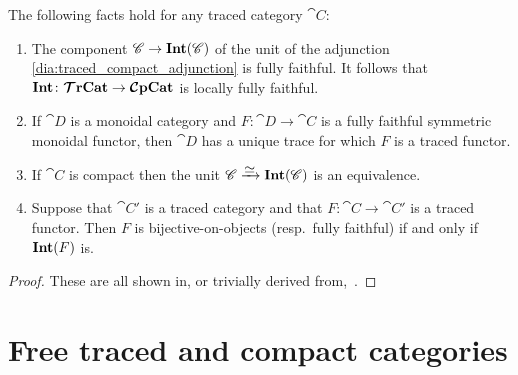 \documentclass[11pt,oneside,article]{memoir}
\begin{document}
\begin{lemma}
      \label{lemma:fully_faithful_and_trace}
   The following facts hold for any traced category $\cat{C}$:
   \begin{enumerate}[label={\upshape\roman*}.]
      \item The component $\mathscr{C}\to\mathbf{Int}(\mathscr{C})$ of the unit of the adjunction
         \eqref{dia:traced_compact_adjunction} is fully faithful. It follows that
         $\mathbf{Int}\colon\bm{\mathcal{T}}\mathbf{rCat}\to\bm{\mathcal{C}}\mathbf{pCat}$ is locally fully faithful.
      \item If $\cat{D}$ is a monoidal category and $F\colon\cat{D}\to\cat{C}$ is a fully faithful
         symmetric monoidal functor, then $\cat{D}$ has a unique trace for which $F$ is a traced
         functor.
      \item If $\cat{C}$ is compact then the unit
         $\cat{C}\To{\raisebox{-1ex}{$\equiv$}}\Int(\cat{C})$ is an equivalence.
      \item Suppose that $\cat{C'}$ is a traced category and that $F\colon \cat{C}\to \cat{C}'$ is a
         traced functor. Then $F$ is bijective-on-objects (resp.\ fully faithful) if and only if
         $\mathbf{Int}(F)$ is.
   \end{enumerate}
\end{lemma}
\begin{proof}
   These are all shown in, or trivially derived from,~\cite{JoyalStreetVerity}.
\end{proof}

\section{Free traced and compact categories}
      \label{sec:free_and_geometry}
\end{document}
